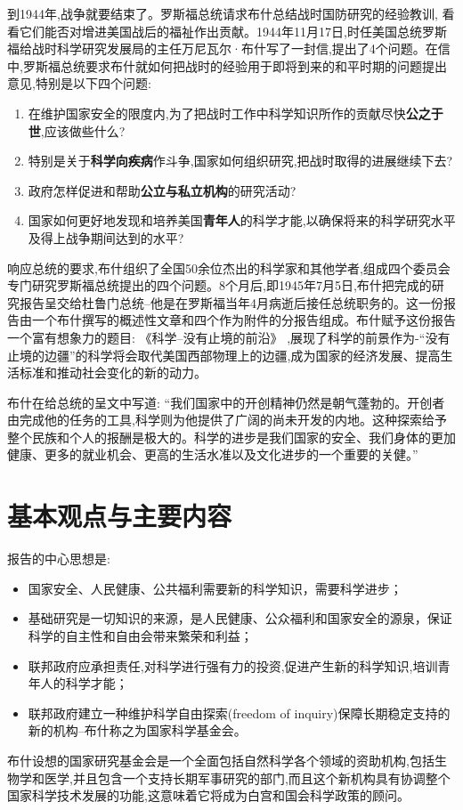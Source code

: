 到1944年,战争就要结束了。罗斯福总统请求布什总结战时国防研究的经验教训,
看看它们能否对增进美国战后的福祉作出贡献。1944年11月17日,时任美国总统罗斯福给战时科学研究发展局的主任万尼瓦尔·布什写了一封信,提出了4个问题。在信中,罗斯福总统要求布什就如何把战时的经验用于即将到来的和平时期的问题提出意见,特别是以下四个问题:

\begin{enumerate}[(1)]
    \item 在维护国家安全的限度内,为了把战时工作中科学知识所作的贡献尽快\textbf{公之于世},应该做些什么? 
    \item 特别是关于\textbf{科学向疾病}作斗争,国家如何组织研究,把战时取得的进展继续下去? \item 政府怎样促进和帮助\textbf{公立与私立机构}的研究活动? 
    \item 国家如何更好地发现和培养美国\textbf{青年人}的科学才能,以确保将来的科学研究水平及得上战争期间达到的水平?
\end{enumerate}

响应总统的要求,布什组织了全国50余位杰出的科学家和其他学者,组成四个委员会专门研究罗斯福总统提出的四个问题。8个月后,即1945年7月5日,布什把完成的研究报告呈交给杜鲁门总统--他是在罗斯福当年4月病逝后接任总统职务的。这一份报告由一个布什撰写的概述性文章和四个作为附件的分报告组成。布什赋予这份报告一个富有想象力的题目: 《科学--没有止境的前沿》 ,展现了科学的前景作为-“没有止境的边疆”的科学将会取代美国西部物理上的边疆,成为国家的经济发展、提高生活标准和推动社会变化的新的动力。

布什在给总统的呈文中写道: “我们国家中的开创精神仍然是朝气蓬勃的。开创者由完成他的任务的工具,科学则为他提供了广阔的尚未开发的内地。这种探索给予整个民族和个人的报酬是极大的。科学的进步是我们国家的安全、我们身体的更加健康、更多的就业机会、更高的生活水准以及文化进步的一个重要的关健。”\cite{ref1}

\section{基本观点与主要内容}

报告的中心思想是:
\begin{itemize}
    \item 国家安全、人民健康、公共福利需要新的科学知识，需要科学进步；
    \item 基础研究是一切知识的来源，是人民健康、公众福利和国家安全的源泉，保证科学的自主性和自由会带来繁荣和利益；
    \item 联邦政府应承担责任,对科学进行强有力的投资,促进产生新的科学知识,培训青年人的科学才能；
    \item 联邦政府建立一种维护科学自由探索(freedom of inquiry)保障长期稳定支持的新的机构--布什称之为国家科学基金会。
    
\end{itemize}
布什设想的国家研究基金会是一个全面包括自然科学各个领域的资助机构,包括生物学和医学,并且包含一个支持长期军事研究的部门,而且这个新机构具有协调整个国家科学技术发展的功能,这意味着它将成为白宫和国会科学政策的顾问。

